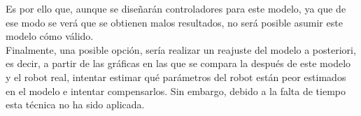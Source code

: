 Es por ello que, aunque se diseñarán controladores para este modelo, ya que de ese modo se verá que se obtienen malos resultados, no será posible asumir este modelo cómo válido.\\

Finalmente, una posible opción, sería realizar un reajuste del modelo a posteriori, es decir, a partir de las gráficas en las que se compara la después de este modelo y el robot real, intentar estimar qué parámetros del robot están peor estimados en el modelo e intentar compensarlos. Sin embargo, debido a la falta de tiempo esta técnica no ha sido aplicada.